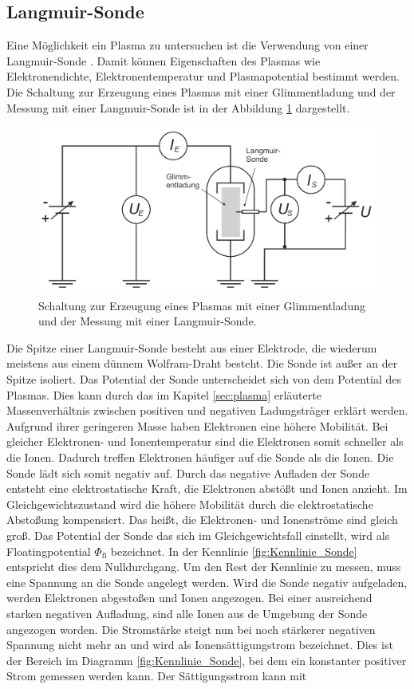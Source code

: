 \subsection{Langmuir-Sonde}\label{sec:Langmuir_Sonde}  
Eine Möglichkeit ein Plasma zu untersuchen ist die Verwendung von einer Langmuir-Sonde \cite{anleitung}. Damit können Eigenschaften des Plasmas wie Elektronendichte, Elektronentemperatur und Plasmapotential bestimmt werden. Die Schaltung zur Erzeugung eines Plasmas mit einer Glimmentladung und der Messung mit einer Langmuir-Sonde ist in der Abbildung \ref{fig:Schaltung_Sonde} dargestellt. 
\begin{figure}[H]
\centering
\includegraphics[scale=0.4]{Schaltung_Sonde.png}
\caption{Schaltung zur Erzeugung eines Plasmas mit einer Glimmentladung und der Messung mit einer Langmuir-Sonde. \cite{anleitung}}
\label{fig:Schaltung_Sonde}
\end{figure}
Die Spitze einer Langmuir-Sonde besteht aus einer Elektrode, die wiederum meistens aus einem dünnem Wolfram-Draht besteht. Die Sonde ist außer an der Spitze isoliert. Das Potential der Sonde unterscheidet sich von dem Potential des Plasmas. Dies kann durch das im Kapitel \ref{sec:plasma} erläuterte Massenverhältnis zwischen positiven und negativen Ladungsträger erklärt werden. Aufgrund ihrer geringeren Masse haben Elektronen eine höhere Mobilität. Bei gleicher Elektronen- und Ionentemperatur sind die Elektronen somit schneller als die Ionen. Dadurch treffen Elektronen häufiger auf die Sonde als die Ionen. Die Sonde lädt sich somit negativ auf. Durch das negative Aufladen der Sonde entsteht eine elektrostatische Kraft, die Elektronen abstößt und  Ionen anzieht. Im Gleichgewichtszustand wird die höhere Mobilität durch die elektrostatische Abstoßung kompensiert. Das heißt, die Elektronen- und Ionenströme sind gleich groß. Das Potential der Sonde das sich im Gleichgewichtsfall einstellt, wird als Floatingpotential $\Phi_{\mathrm{fl}}$ bezeichnet. In der Kennlinie \ref{fig:Kennlinie_Sonde} entspricht dies dem  Nulldurchgang.  Um den Rest der Kennlinie zu messen, muss eine Spannung an die Sonde angelegt werden. Wird die Sonde negativ aufgeladen, werden Elektronen abgestoßen und Ionen angezogen. Bei einer ausreichend starken negativen Aufladung, sind alle Ionen aus de Umgebung der Sonde angezogen worden. Die Stromstärke steigt nun bei noch stärkerer negativen Spannung  nicht mehr an und wird als Ionensättigungstrom bezeichnet. Dies ist der Bereich im Diagramm \ref{fig:Kennlinie_Sonde}, bei dem ein konstanter positiver Strom gemessen werden kann. Der Sättigungsstrom kann mit
